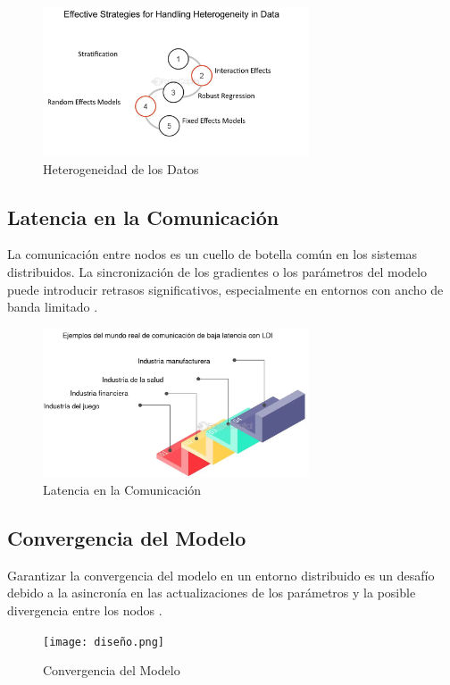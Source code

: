 \begin{figure}[h!]
	\centering
	\includegraphics[width=0.7\textwidth]{hiper.jpg} %
	\caption{Heterogeneidad de los Datos}
	\label{fig:graficofuncion}
\end{figure}
\subsection{Latencia en la Comunicación}
La comunicación entre nodos es un cuello de botella común en los sistemas distribuidos. La sincronización de los gradientes o los parámetros del modelo puede introducir retrasos significativos, especialmente en entornos con ancho de banda limitado \cite{wang2020communication}.
\begin{figure}[h!]
	\centering
	\includegraphics[width=0.7\textwidth]{latecia.jpg} %
	\caption{Latencia en la Comunicación}
	\label{fig:graficofuncion}
\end{figure}
\subsection{Convergencia del Modelo}
Garantizar la convergencia del modelo en un entorno distribuido es un desafío debido a la asincronía en las actualizaciones de los parámetros y la posible divergencia entre los nodos \cite{stich2018local}.
\begin{figure}[h!]
	\centering
	\texttt{[image: diseño.png]} %
	\caption{Convergencia del Modelo}
	\label{fig:graficofuncion}
\end{figure}
